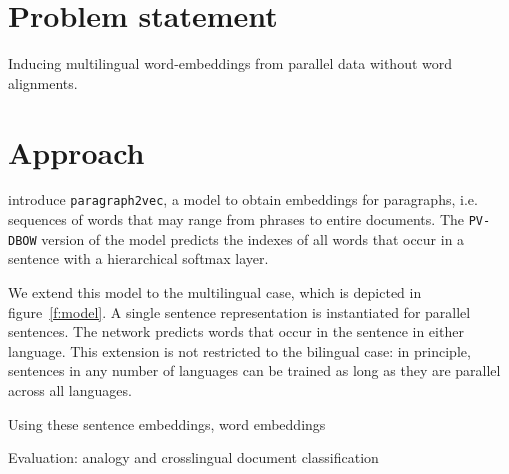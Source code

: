 \documentclass[a4paper,11pt]{article}
\begin{document}
\section*{Problem statement}

Inducing multilingual word-embeddings from parallel data without word alignments.



\section*{Approach}






\cite{Le2014} introduce {\tt paragraph2vec}, a model to obtain embeddings for paragraphs, i.e. sequences of words that may range from phrases  to entire documents. The {\tt PV-DBOW} version of the model predicts the indexes of all words that occur in a sentence with a hierarchical softmax layer. 

We extend this model to the multilingual case, which is depicted in figure~\ref{f:model}. A single sentence representation is instantiated for parallel sentences. The network predicts words that occur in the sentence in either language. This extension is not restricted to the bilingual case: in principle, sentences in any number of languages can be trained as long as they are parallel across all languages.

Using these sentence embeddings, word embeddings 



Evaluation: analogy and crosslingual document classification

\end{document}
